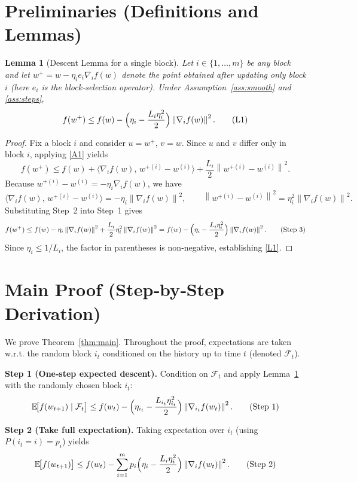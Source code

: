 \documentclass{article}
\newtheorem{lemma}{Lemma}
\newcommand{\E}{\mathbb{E}}
\newcommand{\norm}[1]{\left\lVert #1\right\rVert}
\begin{document}
\section*{Preliminaries (Definitions and Lemmas)}
\begin{lemma}[Descent Lemma for a single block]\label{lem:descent}
Let $i\in\{1,\dots,m\}$ be any block and let $w^{+}=w-\eta_i e_i\nabla_i f(w)$ denote the point obtained after updating only block $i$ (here $e_i$ is the block‑selection operator). Under Assumption~\ref{ass:smooth} and \ref{ass:steps},
\[
f(w^{+})\le f(w)-\Bigl(\eta_i-\frac{L_i\eta_i^{2}}{2}\Bigr)\norm{\nabla_i f(w)}^{2}.
\tag{L1}
\]
\end{lemma}
\begin{proof}
Fix a block $i$ and consider $u=w^{+}$, $v=w$. Since $u$ and $v$ differ only in block $i$, applying \eqref{A1} yields
\[
f(w^{+})\le f(w)+\langle\nabla_i f(w),\,w^{+(i)}-w^{(i)}\rangle
+\frac{L_i}{2}\norm{w^{+(i)}-w^{(i)}}^{2}.
\tag{Step 1}
\]
Because $w^{+(i)}-w^{(i)}=-\eta_i\nabla_i f(w)$, we have
\[
\langle\nabla_i f(w),\,w^{+(i)}-w^{(i)}\rangle
=-\eta_i\norm{\nabla_i f(w)}^{2},
\qquad
\norm{w^{+(i)}-w^{(i)}}^{2}
=\eta_i^{2}\norm{\nabla_i f(w)}^{2}.
\tag{Step 2}
\]
Substituting Step~2 into Step~1 gives
\[
f(w^{+})\le f(w)-\eta_i\norm{\nabla_i f(w)}^{2}
+\frac{L_i}{2}\eta_i^{2}\norm{\nabla_i f(w)}^{2}
= f(w)-\Bigl(\eta_i-\frac{L_i\eta_i^{2}}{2}\Bigr)\norm{\nabla_i f(w)}^{2}.
\tag{Step 3}
\]
Since $\eta_i\le 1/L_i$, the factor in parentheses is non‑negative, establishing \eqref{L1}.
\end{proof}

\section*{Main Proof (Step‑by‑Step Derivation)}
We prove Theorem~\ref{thm:main}. Throughout the proof, expectations are taken w.r.t. the random block $i_t$ conditioned on the history up to time $t$ (denoted $\mathcal{F}_t$).

\noindent\textbf{Step 1 (One‑step expected descent).}
Condition on $\mathcal{F}_t$ and apply Lemma~\ref{lem:descent} with the randomly chosen block $i_t$:
\[
\E\!\bigl[f(w_{t+1})\mid\mathcal{F}_t\bigr]
\le f(w_t)-\Bigl(\eta_{i_t}-\frac{L_{i_t}\eta_{i_t}^{2}}{2}\Bigr)
   \norm{\nabla_{i_t}f(w_t)}^{2}.
\tag{Step 1}
\]

\noindent\textbf{Step 2 (Take full expectation).}
Taking expectation over $i_t$ (using $P(i_t=i)=p_i$) yields
\[
\E\!\bigl[f(w_{t+1})\bigr]
\le f(w_t)-\sum_{i=1}^{m}p_i
   \Bigl(\eta_i-\frac{L_i\eta_i^{2}}{2}\Bigr)
   \norm{\nabla_{i}f(w_t)}^{2}.
\tag{Step 2}
\]
\end{document}
